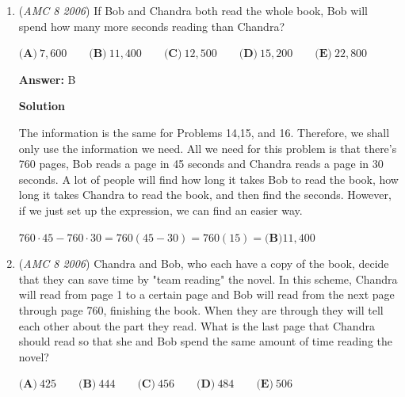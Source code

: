\begin{enumerate}
 



\textbf{Solution 2 (Basic Algebra)}

Let $x$ be the \# of hours after Cassie leaves, when both of them meet. In that $x$ hours, Cassie will travel $12x$ miles. But, Brian will travel $16(x-1/2)$ miles as he starts $1/2$ hours after Cassie. These two distances sum to the total distance of $62$ miles as they meet here, yielding the equation, $12x+16(x-1/2)=62$. After distribution $16$ we get $12x+16x-8=62$. After combining like terms and adding $8$ to both sides we get $28x=70$, and $x=5/2$. So they meet $5/2$ hours after 8:30 a.m. which is $\boxed{\textbf{(D)}\ 11: 00}$.

 - LearnForEver

 


	\item (\textit{AMC 8 2006}) If Bob and Chandra both read the whole book, Bob will spend how many more seconds reading than Chandra? 


 $\textbf{(A)}\ 7,600\qquad\textbf{(B)}\ 11,400\qquad\textbf{(C)}\ 12,500\qquad\textbf{(D)}\ 15,200\qquad\textbf{(E)}\ 22,800$

 \textbf{Answer: }B



\textbf{Solution}

The information is the same for Problems 14,15, and 16. Therefore, we shall only use the information we need. All we need for this problem is that there's 760 pages, Bob reads a page in 45 seconds and Chandra reads a page in 30 seconds. A lot of people will find how long it takes Bob to read the book, how long it takes Chandra to read the book, and then find the seconds. However, if we just set up the expression, we can find an easier way.

 $760\cdot45 - 760\cdot30 = 760(45-30) = 760(15) = \boxed{\textbf{(B)}11,400}$



	\item (\textit{AMC 8 2006}) Chandra and Bob, who each have a copy of the book, decide that they can save time by "team reading" the novel. In this scheme, Chandra will read from page 1 to a certain page and Bob will read from the next page through page 760, finishing the book. When they are through they will tell each other about the part they read. What is the last page that Chandra should read so that she and Bob spend the same amount of time reading the novel?


 $\textbf{(A)}\ 425\qquad\textbf{(B)}\ 444\qquad\textbf{(C)}\ 456\qquad\textbf{(D)}\ 484\qquad\textbf{(E)}\ 506$


\end{enumerate}
